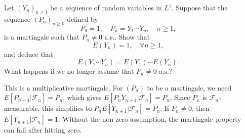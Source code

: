 \begin{exercise}
Let \((Y_n)_{n \geq 1}\) be a sequence of random variables in \(L^1\). Suppose that the sequence \((P_n)_{n \geq 0}\) defined by
\[P_0 = 1, \quad P_n = Y_1 \cdots Y_n, \quad n \geq 1,\]
is a martingale such that \(P_n \neq 0\) a.s.. Show that
\[E(Y_n) = 1, \quad \forall n \geq 1,\]
and deduce that
\[E(Y_1 \cdots Y_n) = E(Y_1) \cdots E(Y_n).\]
What happens if we no longer assume that \(P_n \neq 0\) a.s.?

\begin{reminder}
This is a multiplicative martingale. For \((P_n)\) to be a martingale, we need \(E[P_{n+1}|\mathcal{F}_n] = P_n\), which gives \(E[P_n Y_{n+1}|\mathcal{F}_n] = P_n\). Since \(P_n\) is \(\mathcal{F}_n\)-measurable, this simplifies to \(P_n E[Y_{n+1}|\mathcal{F}_n] = P_n\). If \(P_n \neq 0\), then \(E[Y_{n+1}|\mathcal{F}_n] = 1\). Without the non-zero assumption, the martingale property can fail after hitting zero.
\end{reminder}
\end{exercise}


